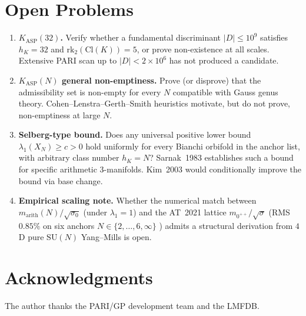 \documentclass[11pt]{article}
\theoremstyle{definition}
\begin{document}
\section{Open Problems}

\begin{enumerate}
\item \textbf{$K_{\mathrm{ASP}}(32)$.} Verify whether a fundamental discriminant $|D| \leq 10^9$ satisfies $h_K = 32$ and $\mathrm{rk}_2(\mathrm{Cl}(K)) = 5$, or prove non-existence at all scales. Extensive PARI scan up to $|D| < 2 \times 10^6$ has not produced a candidate.
\item \textbf{$K_{\mathrm{ASP}}(N)$ general non-emptiness.} Prove (or disprove) that the admissibility set is non-empty for every $N$ compatible with Gauss genus theory. Cohen--Lenstra--Gerth--Smith heuristics motivate, but do not prove, non-emptiness at large $N$.
\item \textbf{Selberg-type bound.} Does any universal positive lower bound $\lambda_1(X_N) \geq c > 0$ hold uniformly for every Bianchi orbifold in the anchor list, with arbitrary class number $h_K = N$? Sarnak~1983 \cite{Sarnak1983} establishes such a bound for specific arithmetic 3-manifolds. Kim~2003 \cite{Kim2003} would conditionally improve the bound via base change.
\item \textbf{Empirical scaling note.} Whether the numerical match between $m_{\mathrm{arith}}(N)/\sqrt{\sigma_0}$ (under $\lambda_1 = 1$) and the AT~2021 lattice $m_{0^{++}}/\sqrt{\sigma}$ (RMS $0.85\%$ on six anchors $N \in \{2,\ldots,6,\infty\}$ \cite{AT2021,Remondiere2026PRL}) admits a structural derivation from $4$D pure $\mathrm{SU}(N)$ Yang--Mills is open.
\end{enumerate}

\section{Acknowledgments}

The author thanks the PARI/GP development team and the LMFDB.
\end{document}
